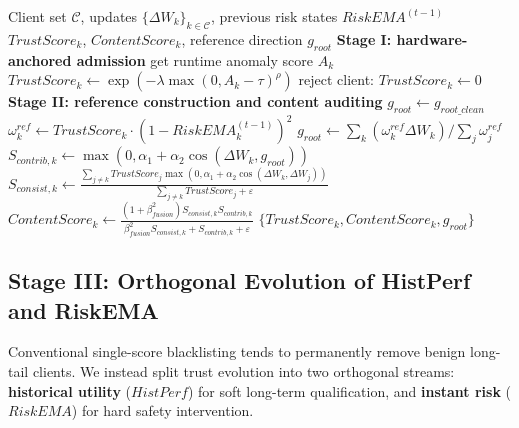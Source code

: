 \documentclass[runningheads]{llncs}
\begin{document}
\begin{algorithm}[htbp]
\caption{TEE-Anchored Admission and Clean-Reference Content Auditing}
\label{alg:phase12}
\begin{algorithmic}[1]
\REQUIRE Client set $\mathcal{C}$, updates $\{\Delta W_k\}_{k\in\mathcal{C}}$, previous risk states $RiskEMA^{(t-1)}$
\ENSURE $TrustScore_k$, $ContentScore_k$, reference direction $g_{root}$
\STATE \textbf{Stage I: hardware-anchored admission}
        \STATE get runtime anomaly score $A_k$
        \STATE $TrustScore_k \leftarrow \exp(-\lambda \max(0, A_k-\tau)^\rho)$
    \ELSE
        \STATE reject client: $TrustScore_k \leftarrow 0$
    \ENDIF
\ENDFOR
\STATE \textbf{Stage II: reference construction and content auditing}
    \STATE $g_{root} \leftarrow g_{root\_clean}$
\ELSE
    \STATE $\omega_k^{ref} \leftarrow TrustScore_k \cdot (1 - RiskEMA_k^{(t-1)})^2$
    \STATE $g_{root} \leftarrow \sum_k (\omega_k^{ref} \Delta W_k) / \sum_j \omega_j^{ref}$
\ENDIF
{}
    \STATE $S_{contrib,k} \leftarrow \max(0, \alpha_1 + \alpha_2 \cos(\Delta W_k, g_{root}))$
    \STATE $S_{consist,k} \leftarrow \frac{\sum_{j \neq k} TrustScore_j \max(0, \alpha_1 + \alpha_2 \cos(\Delta W_k, \Delta W_j))}{\sum_{j \neq k} TrustScore_j + \varepsilon}$
    \STATE $ContentScore_k \leftarrow \frac{(1+\beta_{fusion}^2)S_{consist,k} S_{contrib,k}}{\beta_{fusion}^2 S_{consist,k} + S_{contrib,k} + \varepsilon}$
\ENDFOR
\RETURN $\{TrustScore_k, ContentScore_k, g_{root}\}$
\end{algorithmic}
\end{algorithm}

\subsection{Stage III: Orthogonal Evolution of HistPerf and RiskEMA}
Conventional single-score blacklisting tends to permanently remove benign long-tail clients. We instead split trust evolution into two orthogonal streams: \textbf{historical utility} ($HistPerf$) for soft long-term qualification, and \textbf{instant risk} ($RiskEMA$) for hard safety intervention.
\end{document}
